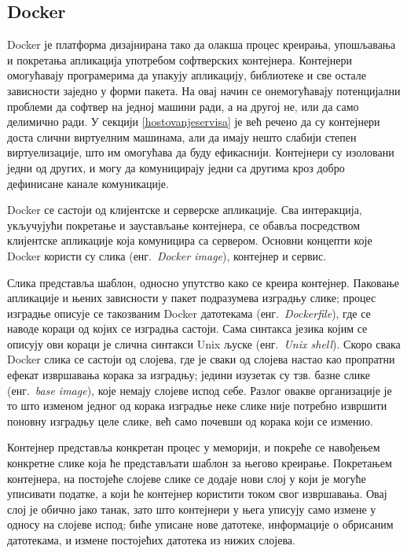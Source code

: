 \documentclass[12pt,oneside]{memoir}
\begin{document}
\subsection{Docker}
Docker је платформа дизајнирана тако да олакша процес креирања, упошљавања и покретања апликација употребом софтверских контејнера. Контејнери омогућавају програмерима да упакују апликацију, библиотеке и све остале зависности заједно у форми пакета. На овај начин се онемогућавају потенцијални проблеми да софтвер на једној машини ради, а на другој не, или да само делимично ради. У секцији \ref{hostovanjeservisa} је већ речено да су контејнери доста слични виртуелним машинама, али да имају нешто слабији степен виртуелизације, што им омогућава да буду ефикаснији. Контејнери су изоловани једни од других, и могу да комуницирају једни са другима кроз добро дефинисане канале комуникације.

Docker се састоји од клијентске и серверске апликације. Сва интеракција, укључујући покретање и заустављање контејнера, се обавља посредством клијентске апликације која комуницира са сервером. Основни концепти које Docker користи су слика (енг.~\textit{Docker image}), контејнер и сервис.

Слика представља шаблон, односно упутство како се креира контејнер. Паковање апликације и њених зависности у пакет подразумева изградњу слике; процес изградње описује се такозваним Docker датотекама (енг.~\textit{Dockerfile}), где се наводе кораци од којих се изградња састоји. Сама синтакса језика којим се описују ови кораци је слична синтакси Unix љуске (енг.~\textit{Unix shell}). Скоро свака Docker слика се састоји од слојева, где је сваки од слојева настао као пропратни ефекат извршавања корака за изградњу; једини изузетак су тзв. базне слике (енг.~\textit{base image}), које немају слојеве испод себе. Разлог овакве организације је то што изменом једног од корака изградње неке слике није потребно извршити поновну изградњу целе слике, већ само почевши од корака који се изменио.

Контејнер представља конкретан процес у меморији, и покреће се навођењем конкретне слике која ће представљати шаблон за његово креирање. Покретањем контејнера, на постојеће слојеве слике се додаје нови слој у који је могуће уписивати податке, а који ће контејнер користити током свог извршавања. Овај слој је обично јако танак, зато што контејнери у њега уписују само измене у односу на слојеве испод; биће уписане нове датотеке, информације о обрисаним датотекама, и измене постојећих датотека из нижих слојева.
\end{document}

